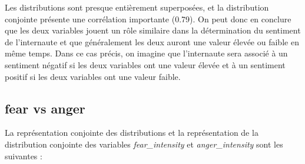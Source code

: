 \documentclass{article}
\begin{document}
Les distributions sont presque entièrement superposées, et la distribution conjointe
présente une corrélation importante (0.79). On peut donc en conclure que les deux variables
jouent un rôle similaire dans la détermination du sentiment de l'internaute et que
généralement les deux auront une valeur élevée ou faible en même temps. Dans ce cas
précis, on imagine que l'internaute sera associé à un sentiment négatif si les deux
variables ont une valeur élevée et à un sentiment positif si les deux variables ont
une valeur faible.

\subsection*{fear vs anger}

La représentation conjointe des distributions et la représentation de la
distribution conjointe des variables
\textit{fear\_intensity} et \textit{anger\_intensity}
sont les suivantes :
\end{document}
